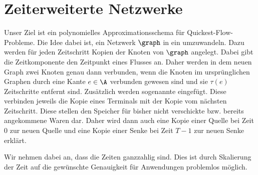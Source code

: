 \section{Zeiterweiterte Netzwerke}

Unser Ziel ist ein polynomielles Approximationsschema für Quickest-Flow-Probleme.
Die Idee dabei ist, ein Netzwerk $\graph$ in ein 
umzuwandeln. Dazu werden für jeden Zeitschritt Kopien der Knoten von $\graph$
angelegt. Dabei gibt die Zeitkomponente den Zeitpunkt eines Flusses an. Daher
werden in dem neuen Graph zwei Knoten genau dann verbunden, wenn die Knoten
im ursprünglichen Graphen durch eine Kante $e \in \A$ verbunden gewesen sind und
sie $\tau(e)$ Zeitschritte entfernt sind. Zusätzlich werden sogenannte
 eingefügt. Diese verbinden jeweils die Kopie eines
Terminals mit der Kopie vom nächsten Zeitschritt. Diese stellen den Speicher
für bisher nicht verschickte bzw. bereits angekommene Waren dar.
Daher wird dann auch eine Kopie einer Quelle bei Zeit $0$ zur neuen Quelle
und eine Kopie einer Senke bei Zeit $T-1$ zur neuen Senke erklärt.

Wir nehmen dabei an, dass die Zeiten ganzzahlig sind. Dies ist durch Skalierung
der Zeit auf die gewünschte Genauigkeit für Anwendungen problemlos möglich.

